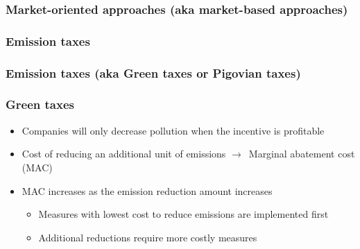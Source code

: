\documentclass{article}
\begin{document}
\subsubsection{Market-oriented approaches (aka market-based approaches)}
\subsubsection{Emission taxes}
\subsubsection{Emission taxes (aka Green taxes or Pigovian taxes)}
\subsubsection{Green taxes}
\begin{itemize}
    \item Companies will only decrease pollution when the incentive is profitable
    \item Cost of reducing an additional unit of emissions $\to$\ Marginal abatement cost (MAC)
    \item MAC increases as the emission reduction amount increases
    \begin{itemize}[label=$\to$]
        \item Measures with lowest cost to reduce emissions are implemented first
        \item Additional reductions require more costly measures
    \end{itemize}
\end{itemize}

\todo
\end{document}
